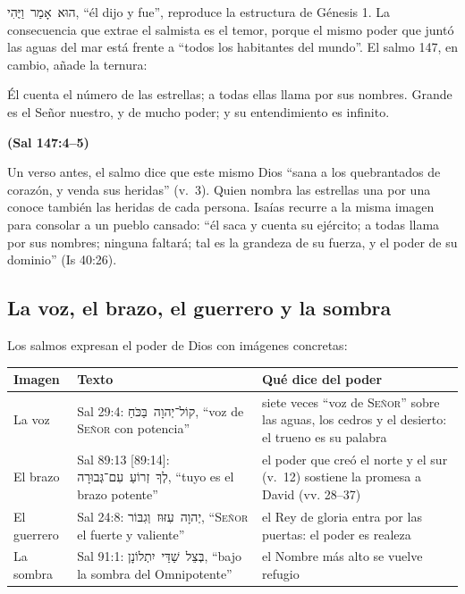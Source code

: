 \documentclass[11pt,letterpaper]{article}
\newcommand{\heb}[1]{\mbox{\foreignlanguage{hebrew}{#1}}}
\newcommand{\SENOR}{\textsc{Señor}}
\newcommand{\fuente}[1]{\par\hfill{\upshape\bfseries\small\textcolor{azul}{#1}}}
\begin{document}
\heb{הוּא אָמַר וַיֶּהִי}, ``él dijo y fue'', reproduce la estructura de Génesis 1. La consecuencia que extrae el salmista es el temor, porque el mismo poder que juntó las aguas del mar está frente a ``todos los habitantes del mundo''. El salmo 147, en cambio, añade la ternura:

\begin{cita}Él cuenta el número de las estrellas; a todas ellas llama por sus nombres. Grande es el Señor nuestro, y de mucho poder; y su entendimiento es infinito.\fuente{(Sal 147:4--5)}\end{cita}

Un verso antes, el salmo dice que este mismo Dios ``sana a los quebrantados de corazón, y venda sus heridas'' (v.~3). Quien nombra las estrellas una por una conoce también las heridas de cada persona. Isaías recurre a la misma imagen para consolar a un pueblo cansado: ``él saca y cuenta su ejército; a todas llama por sus nombres; ninguna faltará; tal es la grandeza de su fuerza, y el poder de su dominio'' (Is 40:26).

\subsection{La voz, el brazo, el guerrero y la sombra}

Los salmos expresan el poder de Dios con imágenes concretas:

\begin{center}\small\renewcommand{\arraystretch}{1.25}
\begin{tabular}{@{}L{1.9cm}L{5.6cm}L{6.9cm}@{}}
\toprule
\textbf{Imagen} & \textbf{Texto} & \textbf{Qué dice del poder} \\ \midrule
La voz & Sal 29:4: \heb{קוֹל־יְהוָה בַּכֹּחַ}, ``voz de \SENOR{} con potencia'' & siete veces ``voz de \SENOR'' sobre las aguas, los cedros y el desierto: el trueno es su palabra \\
El brazo & Sal 89:13 [89:14]: \heb{לְךָ זְרוֹעַ עִם־גְּבוּרָה}, ``tuyo es el brazo potente'' & el poder que creó el norte y el sur (v.~12) sostiene la promesa a David (vv. 28--37) \\
El guerrero & Sal 24:8: \heb{יְהוָה עִזּוּז וְגִבּוֹר}, ``\SENOR{} el fuerte y valiente'' & el Rey de gloria entra por las puertas: el poder es realeza \\
La sombra & Sal 91:1: \heb{בְּצֵל שַׁדַּי יִתְלוֹנָן}, ``bajo la sombra del Omnipotente'' & el Nombre más alto se vuelve refugio \\
\bottomrule
\end{tabular}\end{center}
\end{document}
